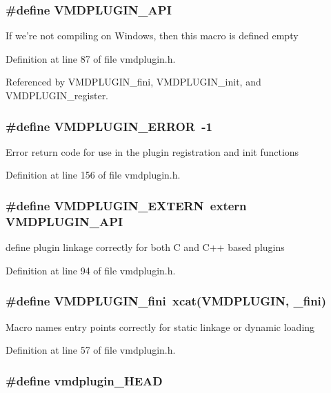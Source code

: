 \subsubsection{\setlength{\rightskip}{0pt plus 5cm}\#define VMDPLUGIN\_\-API}\label{vmdplugin_8h_a7}


If we're not compiling on Windows, then this macro is defined empty 

Definition at line 87 of file vmdplugin.h.

Referenced by VMDPLUGIN\_\-fini, VMDPLUGIN\_\-init, and VMDPLUGIN\_\-register.
\subsubsection{\setlength{\rightskip}{0pt plus 5cm}\#define VMDPLUGIN\_\-ERROR\ -1}\label{vmdplugin_8h_a14}


Error return code for use in the plugin registration and init functions 

Definition at line 156 of file vmdplugin.h.
\subsubsection{\setlength{\rightskip}{0pt plus 5cm}\#define VMDPLUGIN\_\-EXTERN\ extern VMDPLUGIN\_\-API}\label{vmdplugin_8h_a8}


define plugin linkage correctly for both C and C++ based plugins 

Definition at line 94 of file vmdplugin.h.
\subsubsection{\setlength{\rightskip}{0pt plus 5cm}\#define VMDPLUGIN\_\-fini\ xcat(VMDPLUGIN, \_\-fini)}\label{vmdplugin_8h_a6}


Macro names entry points correctly for static linkage or dynamic loading 

Definition at line 57 of file vmdplugin.h.
\subsubsection{\setlength{\rightskip}{0pt plus 5cm}\#define vmdplugin\_\-HEAD}\label{vmdplugin_8h_a9}


